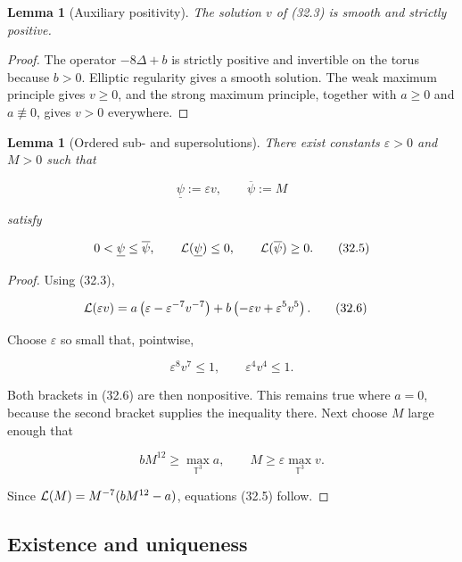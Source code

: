 \documentclass[11pt]{article}
\newtheorem{lemma}[theorem]{Lemma}
\theoremstyle{remark}
\begin{document}
\begin{lemma}[Auxiliary positivity]
\label{lem:v19v29-auxiliary}
The solution \(v\) of (32.3) is smooth and strictly positive.
\end{lemma}

\begin{proof}
The operator \(-8\Delta+b\) is strictly positive and invertible on the
torus because \(b>0\).  Elliptic regularity gives a smooth solution.
The weak maximum principle gives \(v\geq0\), and the strong maximum
principle, together with \(a\geq0\) and \(a\not\equiv0\), gives
\(v>0\) everywhere.
\end{proof}

\begin{lemma}[Ordered sub- and supersolutions]
\label{lem:v19v29-barriers}
There exist constants \(\varepsilon>0\) and \(M>0\) such that

\[
 \underline\psi:=\varepsilon v,\qquad
 \overline\psi:=M                                             \tag{32.4}
\]

satisfy

\[
 0<\underline\psi\leq\overline\psi,\qquad
 {\cal L}(\underline\psi)\leq0,\qquad
 {\cal L}(\overline\psi)\geq0.                                \tag{32.5}
\]
\end{lemma}

\begin{proof}
Using (32.3),

\[
 \begin{split}
 {\cal L}(\varepsilon v)
 &=a\left(\varepsilon-\varepsilon^{-7}v^{-7}\right)
 +b\left(-\varepsilon v+\varepsilon^5v^5\right).              \tag{32.6}
 \end{split}
\]

Choose \(\varepsilon\) so small that, pointwise,

\[
 \varepsilon^8v^7\leq1,\qquad
 \varepsilon^4v^4\leq1.                                      \tag{32.7}
\]

Both brackets in (32.6) are then nonpositive.  This remains true where
\(a=0\), because the second bracket supplies the inequality there.
Next choose \(M\) large enough that

\[
 bM^{12}\geq\max_{\mathbb T^3}a,\qquad
 M\geq\varepsilon\max_{\mathbb T^3}v.                         \tag{32.8}
\]

Since
\({\cal L}(M)=M^{-7}(bM^{12}-a)\), equations (32.5) follow.
\end{proof}

\subsection{Existence and uniqueness}
\end{document}
